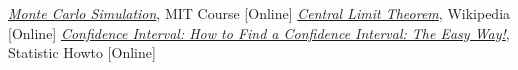 \begin{thebibliography}{9}
\href{https://www.youtube.com/watch?v=OgO1gpXSUzU}{\emph{Monte Carlo Simulation}}, MIT Course [Online]
 \href{https://en.wikipedia.org/wiki/Central_limit_theorem}{\emph{Central Limit Theorem}}, Wikipedia [Online]
\href{https://www.statisticshowto.com/probability-and-statistics/confidence-interval}{\emph{Confidence Interval: How to Find a Confidence Interval: The Easy Way!}}, Statistic Howto [Online]
\end{thebibliography}









